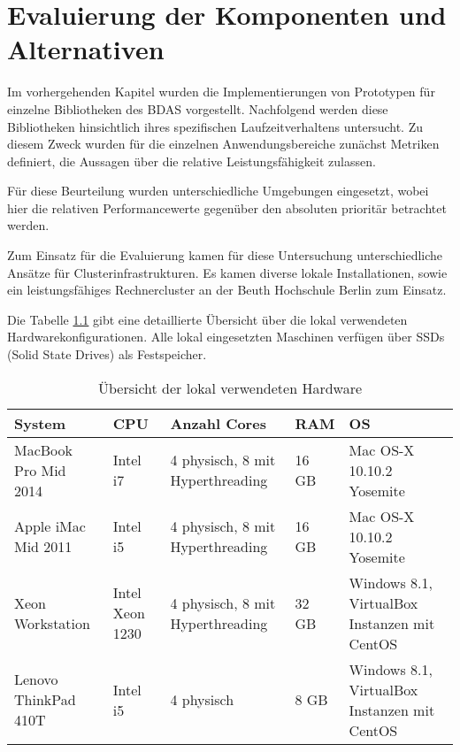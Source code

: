 \chapter{Evaluierung der Komponenten und Alternativen }
\label{chapter:evaluierung}

Im vorhergehenden Kapitel wurden die Implementierungen von Prototypen für einzelne Bibliotheken des BDAS vorgestellt. Nachfolgend werden diese Bibliotheken hinsichtlich ihres spezifischen Laufzeitverhaltens untersucht. Zu diesem Zweck wurden für die einzelnen Anwendungsbereiche zunächst Metriken definiert, die Aussagen über die relative Leistungsfähigkeit zulassen. 

Für diese Beurteilung wurden unterschiedliche Umgebungen eingesetzt, wobei hier die relativen Performancewerte gegenüber den absoluten prioritär betrachtet werden.

Zum Einsatz für die Evaluierung kamen für diese Untersuchung unterschiedliche Ansätze für Clusterinfrastrukturen. Es kamen diverse lokale Installationen, sowie ein leistungsfähiges Rechnercluster an der Beuth Hochschule Berlin zum Einsatz.  

Die Tabelle \ref{tab:lokale hardware} gibt eine detaillierte Übersicht über die lokal verwendeten Hardwarekonfigurationen. Alle lokal eingesetzten Maschinen verfügen über SSDs (Solid State Drives) als Festspeicher.

\begin{table}[!ht]
\centering
\begin{tabular}{| p{3cm} | p{2.2cm} |  p{3cm} |  p{1.2cm} | p{3cm} | }
\hline
System & CPU & Anzahl Cores & RAM & OS\\ \hline \hline
MacBook Pro Mid 2014 & Intel i7 & 4 physisch, 8 mit Hyperthreading & 16 GB & Mac OS-X 10.10.2 Yosemite \\ \hline
Apple iMac Mid 2011 & Intel i5 & 4 physisch, 8 mit Hyperthreading & 16 GB & Mac OS-X 10.10.2 Yosemite \\ \hline
Xeon Workstation & Intel Xeon 1230 & 4 physisch, 8 mit Hyperthreading & 32 GB & Windows 8.1,  VirtualBox Instanzen mit CentOS  \\ \hline 
Lenovo ThinkPad 410T & Intel i5 & 4 physisch & 8 GB & Windows 8.1, VirtualBox Instanzen mit CentOS  \\ \hline 

\end{tabular}
\caption{Übersicht der lokal verwendeten Hardware}
	\label{tab:lokale hardware}
\end{table}  

